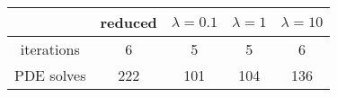 \begin{tabular}{ccccc}
& reduced & $\lambda = 0.1$ & $\lambda = 1$ & $\lambda = 10$ \\
\hline
iterations & 6 & 5 & 5 & 6 \\
PDE solves & 222 & 101 & 104 & 136 \\
\hline
\end{tabular}
